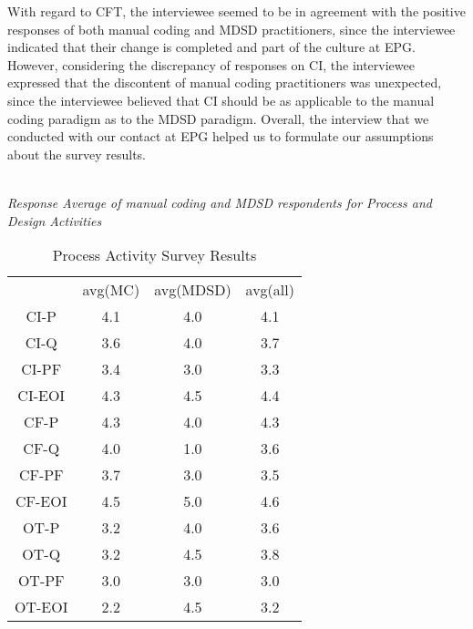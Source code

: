 \documentclass[final_report_innit.tex]{subfiles}
\newcommand\Tstrut{\rule{0pt}{2.6ex}}       %
\begin{document}
With regard to CFT, the interviewee seemed to be in agreement with the positive responses of both manual coding and MDSD practitioners, since the interviewee indicated that their change is completed and part of the culture at EPG. However, considering the discrepancy of responses on CI, the interviewee expressed that the discontent of manual coding practitioners was unexpected, since the interviewee believed that CI should be as applicable to the manual coding paradigm as to the MDSD paradigm. Overall, the interview that we conducted with our contact at EPG helped us to formulate our assumptions about the survey results. 
\\
\\


\begin{center}\textit{Response Average of manual coding and MDSD respondents for Process and Design Activities}\end{center}

\begin{table}[h]
	\caption{Process Activity Survey Results}
	\begin{center}
		\begin{tabular}{cccc}
		
                             & avg(MC) & avg(MDSD) & avg(all) \Tstrut \\ 
		CI-P   & 4.1 & 4.0 & 4.1 \Tstrut \\ 
		CI-Q   & 3.6 & 4.0 & 3.7 \Tstrut \\ 
		CI-PF  & 3.4 & 3.0 & 3.3 \Tstrut \\ 
		CI-EOI & 4.3 & 4.5 & 4.4 \Tstrut \\ 
		CF-P   & 4.3 & 4.0 & 4.3 \Tstrut \\ 
		CF-Q   & 4.0 & 1.0 & 3.6 \Tstrut \\ 
		CF-PF  & 3.7 & 3.0 & 3.5 \Tstrut \\ 
		CF-EOI & 4.5 & 5.0 & 4.6 \Tstrut \\ 
		OT-P   & 3.2 & 4.0 & 3.6 \Tstrut \\ 
		OT-Q   & 3.2 & 4.5 & 3.8 \Tstrut \\ 
		OT-PF  & 3.0 & 3.0 & 3.0 \Tstrut \\ 
		OT-EOI & 2.2 & 4.5 & 3.2 \Tstrut \\ 
		\end{tabular}
	\end{center}
\end{table}
\end{document}
